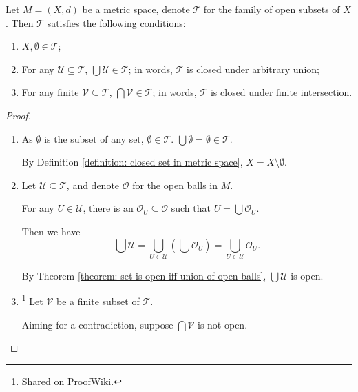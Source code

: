 \begin{theorem}
	Let $M = (X, d)$ be a metric space, denote $\mathcal T$ for the family of open subsets of $X$. Then $\mathcal T$ satisfies the following conditions:
	
	\begin{enumerate}[\bf O1.]
		\item $X, \emptyset \in \mathcal T$;
		\item For any $\mathcal U \subseteq \mathcal T$, $\bigcup \mathcal U \in \mathcal T$; in words, $\mathcal T$ is closed under arbitrary union;
		\item For any finite $\mathcal V \subseteq \mathcal T$, $\bigcap \mathcal V \in \mathcal T$; in words, $\mathcal T$ is closed under finite intersection.
	\end{enumerate}
	
	\begin{proof} \
		\begin{enumerate}[\bf O1.]
			\item
				As $\emptyset$ is the subset of any set, $\emptyset \in \mathcal T$. $\bigcup \emptyset = \emptyset \in \mathcal T$.
			
				By Definition \ref{definition: closed set in metric space}, $X = X \setminus \emptyset$.
				
				\qedlemma
				
			\item 
				Let $\mathcal U \subseteq \mathcal T$, and denote $\mathcal O$ for the open balls in $M$.
			
				For any $U \in \mathcal U$, there is an $\mathcal O_U \subseteq \mathcal O$ such that $U = \bigcup \mathcal O_U$. 
				
				Then we have
				$$
				\bigcup \mathcal U = \bigcup_{U \in \mathcal U} \left( \bigcup \mathcal O_U \right) = \bigcup_{U \in \mathcal U} \mathcal O_U.
				$$
				
				By Theorem \ref{theorem: set is open iff union of open balls}, $\bigcup \mathcal U$ is open.
				
				\qedlemma
				
			\item
				\footnote{
					Shared on \href{https://proofwiki.org/wiki/Finite_Intersection_of_Open_Sets_of_Metric_Space_is_Open}{ProofWiki}.
				}
				Let $\mathcal V$ be a finite subset of $\mathcal T$.
				
				Aiming for a contradiction, suppose $\bigcap \mathcal V$ is not open.
				

\end{enumerate}
\end{proof}
\end{theorem}
